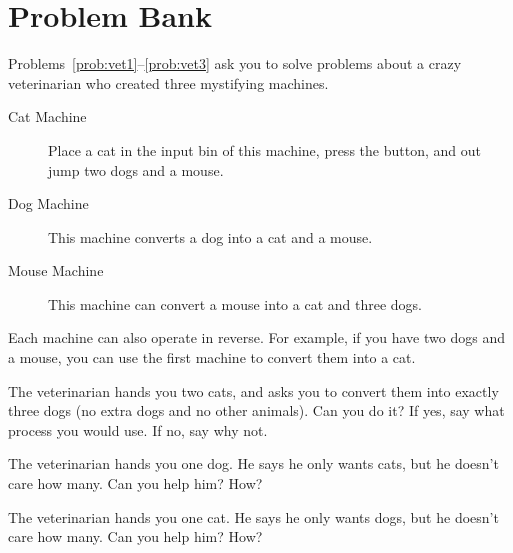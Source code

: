 \newpage




\section{Problem Bank}

Problems~\ref{prob:vet1}--\ref{prob:vet3} ask you to solve problems about a crazy veterinarian who created three mystifying machines. 
\begin{description}
\item[Cat Machine]
Place a cat in the input bin of this machine, press the button, and out jump two dogs and a mouse. \\
\item[Dog Machine]
This machine  converts a dog into a cat and a mouse.\\
\item[Mouse Machine]
This machine can convert a mouse into a cat and three dogs. \\
\end{description}
Each machine can also operate in reverse.  For example, if you have two dogs and a mouse, you can use the first machine to convert them into a cat. 

\bigskip

\begin{problem}\label{prob:vet1}
The  veterinarian hands you two cats, and asks you to convert them into exactly three dogs (no extra dogs and no other animals). Can you do it?  If yes, say what process you would use.  If no, say why not.
\end{problem}

\bigskip

\begin{problem}\label{prob:vet2}
The  veterinarian hands you one dog.  He says he only wants cats, but he doesn't care how many.  Can you help him?  How?
\end{problem}

\bigskip
\begin{problem}\label{prob:vet3}
The  veterinarian hands you one cat.  He says he only wants dogs, but he doesn't care how many.  Can you help him?  How?
\end{problem}

\newpage


